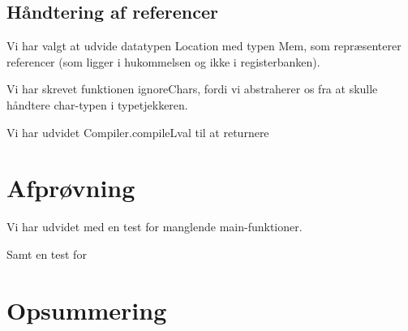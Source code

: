 \documentclass[10pt,a4paper,danish]{article}
\begin{document}
\subsection{Håndtering af referencer}
Vi har valgt at udvide datatypen Location med typen Mem, som repræsenterer
referencer (som ligger i hukommelsen og ikke i registerbanken). 

Vi har skrevet funktionen ignoreChars, fordi vi abstraherer os fra at skulle 
håndtere char-typen i typetjekkeren.    
 
Vi har udvidet Compiler.compileLval til at returnere 

\section{Afprøvning}
Vi har udvidet med en test for manglende main-funktioner. 

Samt en test for 

\section{Opsummering}
\end{document}
